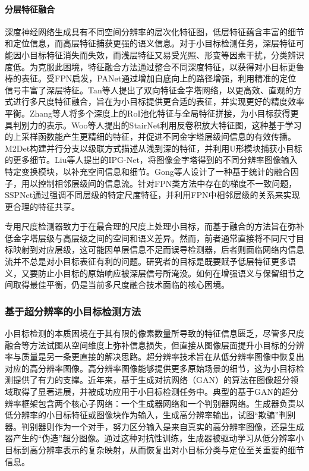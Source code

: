 \paragraph{分层特征融合}
深度神经网络生成具有不同空间分辨率的层次化特征图，低层特征蕴含丰富的细节和定位信息，而高层特征捕获更强的语义信息。对于小目标检测任务，深层特征可能因小目标特征消失而失效，而浅层特征又易受光照、形变等因素干扰，分类辨识度低。为克服此困境，特征融合方法通过整合不同深度特征\cite{WLWX202403014}，以获得对小目标更鲁棒的表征。受FPN启发，PANet\cite{Liu2018PANet}通过增加自底向上的路径增强，利用精准的定位信号丰富了深层特征。Tan等人\cite{TanEfficientDet}提出了双向特征金字塔网络，以更高效、直观的方式进行多尺度特征融合，旨在为小目标提供更合适的表征，并实现更好的精度效率平衡。Zhang等人\cite{ZhangMFR-CNN}将多个深度上的RoI池化特征与全局特征拼接，为小目标获得更具判别力的表示。Woo等人\cite{Woo2017StairNetTS}提出的StairNet利用反卷积放大特征图，这种基于学习的上采样函数能产生更精细的特征，并促进不同金字塔层级间信息的有效传播。M2Det\cite{M2Det2019aaai}构建并行分支以级联方式描述从浅到深的特征，并利用U形模块捕获小目标的更多细节。Liu等人\cite{Liu2020IPGNet}提出的IPG-Net，将图像金字塔得到的不同分辨率图像输入特定变换模块，以补充空间信息和细节。Gong等人\cite{Gong2021EffectiveFPN}设计了一种基于统计的融合因子，用以控制相邻层级间的信息流。针对FPN类方法中存在的梯度不一致问题，SSPNet\cite{Hong2022SSPNet}通过强调不同层级的特定尺度特征，并利用FPN中相邻层级的关系来实现更合理的特征共享。

专用尺度检测器致力于在最合理的尺度上处理小目标，而基于融合的方法旨在弥补低金字塔层级与高层级之间的空间和语义差异。然而，前者通常直接将不同尺寸目标映射到对应层级，这可能因单层信息不足而误导检测器，后者则面临网络内信息流并不总是对小目标表征有利的问题。研究者的目标是既要赋予低层特征更多语义，又要防止小目标的原始响应被深层信号所淹没。如何在增强语义与保留细节之间取得最佳平衡，仍是当前多尺度融合技术面临的核心困境。

\subsubsection{基于超分辨率的小目标检测方法}
小目标检测的本质困境在于其有限的像素数量所导致的特征信息匮乏，尽管多尺度融合等方法试图从空间维度上弥补信息损失，但直接从图像层面提升小目标的分辨率与质量是另一条更直接的解决思路。超分辨率技术旨在从低分辨率图像中恢复出对应的高分辨率图像。高分辨率图像能够提供更多原始场景的细节，这为小目标检测提供了有力的支撑。近年来，基于生成对抗网络（GAN）\cite{Goodfellow2014GAN}的算法在图像超分领域取得了显著进展，并被成功应用于小目标检测任务中。典型的基于GAN的超分辨率框架包含两个核心子网络：一个生成器网络和一个判别器网络。生成器负责以低分辨率的小目标特征或图像块作为输入，生成高分辨率输出，试图“欺骗”判别器。判别器则作为一个对手，努力区分输入是来自真实的高分辨率图像，还是生成器产生的“伪造”超分图像。通过这种对抗性训练，生成器被驱动学习从低分辨率小目标到高分辨率表示的复杂映射，从而恢复出对小目标分类与定位至关重要的细节信息。

